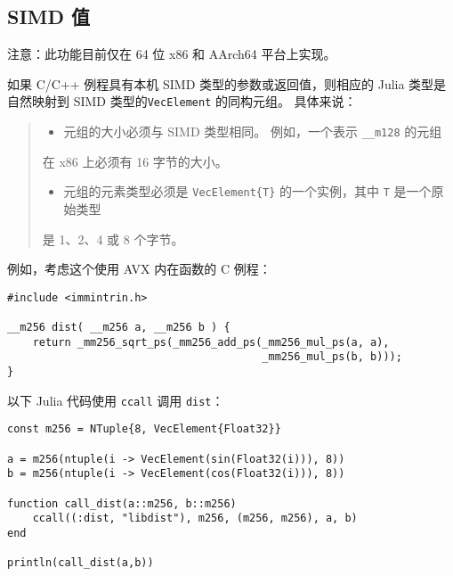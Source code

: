 \hypertarget{12802490213714574525}{}


\subsection{SIMD 值}



注意：此功能目前仅在 64 位 x86 和 AArch64 平台上实现。



如果 C/C++ 例程具有本机 SIMD 类型的参数或返回值，则相应的 Julia 类型是自然映射到 SIMD 类型的\texttt{VecElement} 的同构元组。 具体来说：



\begin{quote}
\begin{itemize}
\item 元组的大小必须与 SIMD 类型相同。 例如，一个表示 \texttt{\_\_m128} 的元组

\end{itemize}
在 x86 上必须有 16 字节的大小。

\begin{itemize}
\item 元组的元素类型必须是 \texttt{VecElement\{T\}} 的一个实例，其中 \texttt{T} 是一个原始类型

\end{itemize}
是 1、2、4 或 8 个字节。

\end{quote}


例如，考虑这个使用 AVX 内在函数的 C 例程：




\begin{lstlisting}
#include <immintrin.h>

__m256 dist( __m256 a, __m256 b ) {
    return _mm256_sqrt_ps(_mm256_add_ps(_mm256_mul_ps(a, a),
                                        _mm256_mul_ps(b, b)));
}
\end{lstlisting}



以下 Julia 代码使用 \texttt{ccall} 调用 \texttt{dist}：




\begin{verbatim}
const m256 = NTuple{8, VecElement{Float32}}

a = m256(ntuple(i -> VecElement(sin(Float32(i))), 8))
b = m256(ntuple(i -> VecElement(cos(Float32(i))), 8))

function call_dist(a::m256, b::m256)
    ccall((:dist, "libdist"), m256, (m256, m256), a, b)
end

println(call_dist(a,b))
\end{verbatim}



